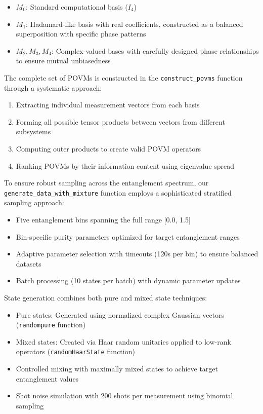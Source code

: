 \documentclass{optica-article}
\begin{document}
\begin{itemize}
\item $M_0$: Standard computational basis ($I_4$)
\item $M_1$: Hadamard-like basis with real coefficients, constructed as a balanced superposition with specific phase patterns
\item $M_2, M_3, M_4$: Complex-valued bases with carefully designed phase relationships to ensure mutual unbiasedness
\end{itemize}

The complete set of POVMs is constructed in the \texttt{construct\_povms} function through a systematic approach:
\begin{enumerate}
\item Extracting individual measurement vectors from each basis
\item Forming all possible tensor products between vectors from different subsystems
\item Computing outer products to create valid POVM operators
\item Ranking POVMs by their information content using eigenvalue spread
\end{enumerate}

To ensure robust sampling across the entanglement spectrum, our \texttt{generate\_data\_with\_mixture} function employs a sophisticated stratified sampling approach:

\begin{itemize}
\item Five entanglement bins spanning the full range [0.0, 1.5]
\item Bin-specific purity parameters optimized for target entanglement ranges
\item Adaptive parameter selection with timeouts (120s per bin) to ensure balanced datasets
\item Batch processing (10 states per batch) with dynamic parameter updates
\end{itemize}

State generation combines both pure and mixed state techniques:
\begin{itemize}
\item Pure states: Generated using normalized complex Gaussian vectors (\texttt{randompure} function)
\item Mixed states: Created via Haar random unitaries applied to low-rank operators (\texttt{randomHaarState} function) 
\item Controlled mixing with maximally mixed states to achieve target entanglement values
\item Shot noise simulation with 200 shots per measurement using binomial sampling
\end{itemize}
\end{document}

